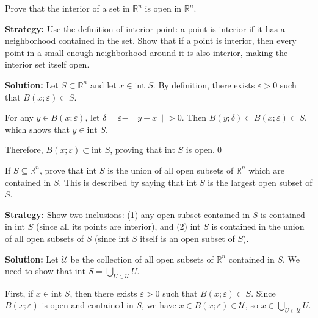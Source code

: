\begin{problembox}
\begin{problemstatement}
Prove that the interior of a set in $\mathbb{R}^n$ is open in $\mathbb{R}^n$.
\end{problemstatement}
\end{problembox}

\noindent\textbf{Strategy:} Use the definition of interior point: a point is interior if it has a neighborhood contained in the set. Show that if a point is interior, then every point in a small enough neighborhood around it is also interior, making the interior set itself open.

\bigskip\noindent\textbf{Solution:} Let $S \subset \mathbb{R}^n$ and let $x \in \text{int } S$. By definition, there exists $\varepsilon > 0$ such that $B(x;\varepsilon) \subset S$.

For any $y \in B(x;\varepsilon)$, let $\delta = \varepsilon - \|y-x\| > 0$. Then $B(y;\delta) \subset B(x;\varepsilon) \subset S$, which shows that $y \in \text{int } S$.

Therefore, $B(x;\varepsilon) \subset \text{int } S$, proving that $\text{int } S$ is open.\qed


\begin{problembox}
\begin{problemstatement}
If $S \subseteq \mathbb{R}^n$, prove that int $S$ is the union of all open subsets of $\mathbb{R}^n$ which are contained in $S$. This is described by saying that int $S$ is the largest open subset of $S$.
\end{problemstatement}
\end{problembox}

\noindent\textbf{Strategy:} Show two inclusions: (1) any open subset contained in $S$ is contained in int $S$ (since all its points are interior), and (2) int $S$ is contained in the union of all open subsets of $S$ (since int $S$ itself is an open subset of $S$).

\bigskip\noindent\textbf{Solution:} Let $\mathcal{U}$ be the collection of all open subsets of $\mathbb{R}^n$ contained in $S$. We need to show that $\text{int } S = \bigcup_{U \in \mathcal{U}} U$.

First, if $x \in \text{int } S$, then there exists $\varepsilon > 0$ such that $B(x;\varepsilon) \subset S$. Since $B(x;\varepsilon)$ is open and contained in $S$, we have $x \in B(x;\varepsilon) \in \mathcal{U}$, so $x \in \bigcup_{U \in \mathcal{U}} U$.

